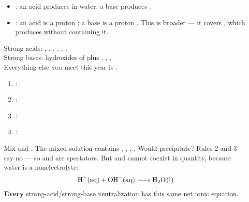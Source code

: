 \documentclass{apchem-notes}
\begin{document}


\begin{itemize}[leftmargin=*,itemsep=0.25em]
  \item {}: an acid produces  in
        water; a base produces .
  \item {}: an acid is a proton
        ; a base is a proton
        . This is broader --- it covers
        , which produces  without containing it.
\end{itemize}


Strong acids: , , , , ,
. \\
Strong bases: hydroxides of  plus
, , . \\
Everything else you meet this year is .


\begin{enumerate}[leftmargin=*,itemsep=0.3em]
  \item {}: 
  \item {}: 
  \item {}: 
  \item {}: 
\end{enumerate}



\begin{workedexample}
Mix  and . The mixed solution contains
, , , . Would  precipitate? Rules 2
and 3 say no --- so  and  are spectators. But  and
 cannot coexist in quantity, because water is a nonelectrolyte:
\[ \ce{H+(aq) + OH^-(aq) -> H2O(l)} \]
\textbf{Every} strong-acid/strong-base neutralization has this same net
ionic equation.
\end{workedexample}
\end{document}
